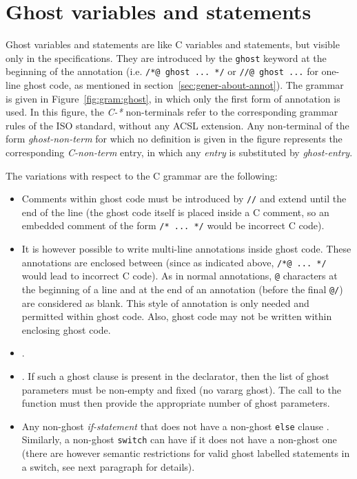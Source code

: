 \section{Ghost variables and statements}
\label{sec:ghost}
Ghost variables and statements are like C variables and statements,
but visible only in the specifications. They are introduced by the
\lstinline|ghost| keyword at the beginning of the annotation
(i.e. \lstinline|/*@ ghost ... */| or \lstinline|//@ ghost ...|
for one-line
ghost code, as mentioned in section~\ref{sec:gener-about-annot}).
The grammar is given in Figure~\ref{fig:gram:ghost}, in which only the
first form of annotation is used. In this figure, the \textit{C-*}
non-terminals refer to the corresponding grammar rules of the ISO standard,
without any ACSL extension. Any non-terminal of the form
\textit{ghost-non-term} for which no definition is given in the figure
represents the corresponding \textit{C-non-term} entry, in which any
\textit{entry} is substituted by \textit{ghost-entry}.

The variations with respect to the C
grammar are the following:
\begin{itemize}
\item Comments within ghost code must be introduced by \lstinline|//| and extend until the
  end of the line (the ghost code itself is placed inside a C
  comment, so an embedded comment of the form \lstinline|/* ... */| would be incorrect C code).
\item It is however possible to write multi-line annotations inside ghost
  code. These annotations are enclosed between
  (since as indicated above, \lstinline|/*@ ... */| would lead
  to incorrect C code).
  As in normal annotations, \lstinline|@| characters at the beginning of a
  line and at the end of an annotation (before the final \lstinline|@/|) are
  considered as blank. 
  This style of annotation is only needed and permitted within ghost code.
  Also, ghost code may not be written within enclosing ghost code.
  
\item {}.
\item {}.
  If such a ghost
  clause is present in the declarator, then the list of ghost
  parameters must be non-empty and fixed (no vararg ghost). The call
  to the function must then provide the appropriate number of ghost parameters.
\item Any non-ghost \textit{if-statement} that does not have a non-ghost
  \lstinline|else| clause . Similarly, a non-ghost
  \lstinline|switch| can have 
  if it does not have a non-ghost one
  (there are however semantic restrictions for valid
  ghost labelled statements in a switch, see next paragraph for details).
\end{itemize}

